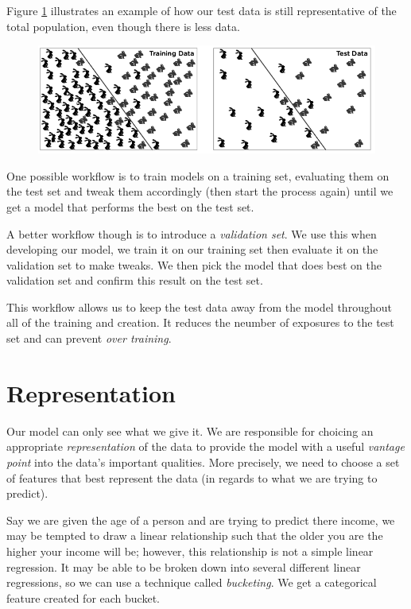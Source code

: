 Figure \ref{fig:training-vs-test} illustrates an example of how
our test data is still representative of the total population,
even though there is less data.

\begin{figure}[]
    \centering
    \includegraphics[width=0.8\linewidth]{images/training-vs-test.png}
    \caption{}
    \label{fig:training-vs-test}
\end{figure}

One possible workflow is to train models on a training set,
evaluating them on the test set and tweak them accordingly
(then start the process again) until we get a model that performs
the best on the test set.

A better workflow though is to introduce a \emph{validation set}.
We use this when developing our model, we train it on our
training set then evaluate it on the validation set to make tweaks.
We then pick the model that does best on the validation set and
confirm this result on the test set. 

This workflow allows us to keep the test data away from the model
throughout all of the training and creation.
It reduces the neumber of exposures to the test set and can
prevent \emph{over training}.

\section{Representation}

Our model can only see what we give it. 
We are responsible for choicing an appropriate \emph{representation}
of the data to provide the model with a useful
\emph{vantage point} into the data's important qualities.
More precisely, we need to choose a set of features that 
best represent the data (in regards to what we are trying to predict).

Say we are given the age of a person and are trying to predict
there income, we may be tempted to draw a linear relationship
such that the older you are the higher your income will be;
however, this relationship is not a simple linear regression.
It may be able to be broken down into several different linear
regressions, so we can use a technique called \emph{bucketing}.
We get a categorical feature created for each bucket.
